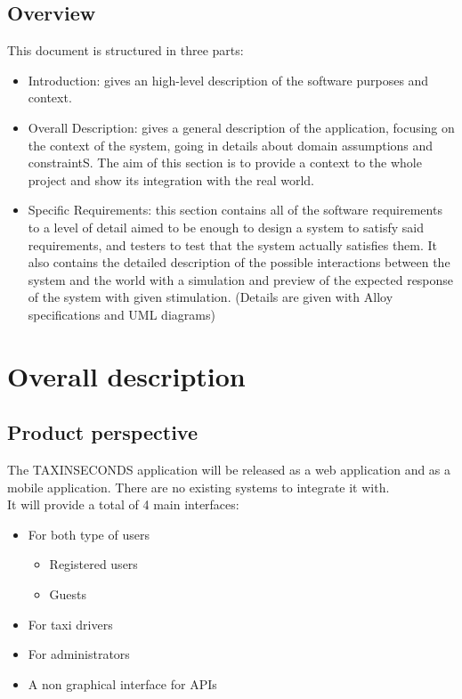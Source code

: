 \documentclass{article}
\begin{document}
\subsection{Overview}
This document is structured in three parts:
\begin{itemize}
	\item Introduction: gives an high-level description of the software purposes and context.
	\item Overall Description: gives a general description of the application, focusing on the context of the system, going in details about domain assumptions and constraintS. The aim of this section is to provide a context to the whole project and show its integration with the real world.
	\item Specific Requirements: this section contains all of the software requirements to a level of detail aimed to be enough to design a system to satisfy said requirements, and testers to test that the system actually satisfies them. It also contains the detailed description of the possible interactions between the system and the world with a simulation and preview of the expected response of the system with given stimulation. (Details are given with Alloy specifications and UML diagrams)
\end{itemize}


\section{Overall description}
\subsection{Product perspective}
The TAXINSECONDS application will be released as a web application and as a mobile application. 
There are no existing systems to integrate it with. 
\\It will provide a total of 4 main interfaces:
\begin{itemize}
	\item For both type of users
		\begin{itemize}
			\item Registered users
			\item Guests
		\end{itemize}
	\item For taxi drivers 
	\item For administrators
	\item A non graphical interface for APIs 
\end{itemize}
\end{document}
